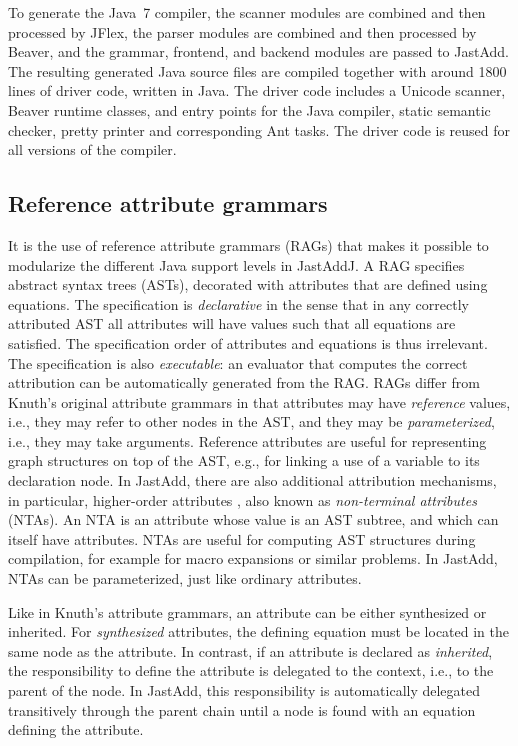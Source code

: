 {To generate the Java~7 compiler,  the scanner modules are combined and then
processed by JFlex,  the parser modules are combined and then processed by
Beaver, and the grammar, frontend, and backend modules are passed to JastAdd.
The resulting generated Java source files are compiled together with around
1800 lines of driver code, written in Java.  The driver code includes a Unicode
scanner, Beaver runtime classes, and entry points for the Java compiler, static
semantic checker, pretty printer and corresponding Ant tasks.  The driver code
is reused for all versions of the compiler.

\subsection{Reference attribute grammars}

It is the use of reference attribute grammars (RAGs) that makes it possible to
modularize the different Java support levels in Jast\-AddJ. A RAG specifies
abstract syntax trees (ASTs), decorated with attributes that are defined using
equations.  The specification is \emph{declarative} in the sense that in any correctly
attributed AST all attributes will have values such that all equations are
satisfied. The specification order of attributes and equations is thus
irrelevant. The specification is also \emph{executable}: an evaluator that
computes the correct attribution can be automatically generated from the RAG.
RAGs differ from Knuth's original attribute grammars \cite{Knuth68} in that
attributes may have \emph{reference} values, i.e., they may refer to other
nodes in the AST, and they may be \emph{parameterized}, i.e., they may take
arguments. Reference attributes are useful for representing graph structures on
top of the AST, e.g., for linking a use of a variable to its declaration node.
In JastAdd, there are also additional attribution mechanisms, in particular,
higher-order attributes \cite{vogt1989higher}, also known as \emph{non-terminal
attributes} (NTAs). An NTA is an attribute whose value is an AST subtree, and
which can itself have attributes. NTAs are useful for computing AST structures
during compilation, for example for macro expansions or similar problems. In
JastAdd, NTAs can be parameterized, just like ordinary attributes.

Like in Knuth's attribute grammars, an attribute can be either synthesized or inherited. For \emph{synthesized} attributes, the defining equation must be located in the same node as the attribute. In contrast, if an attribute is declared as \emph{inherited}, the responsibility to define the attribute is delegated to the context, i.e., to the parent of the node. In JastAdd, this responsibility is automatically delegated transitively through the parent chain until a node is found with an equation defining the attribute.

}
